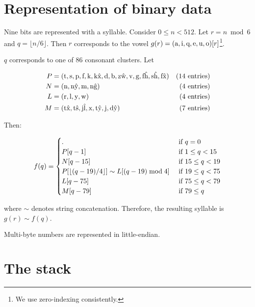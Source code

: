\documentclass{book}
\begin{document}
\section{Representation of binary data}

\newcommand{\kd}[1]{\text{\textkardinal{#1}},}
\newcommand{\kdf}[1]{\text{\textkardinal{#1}}}

Nine bits are represented with a syllable. Consider $0 \le n < 512$. Let $r = n \bmod 6$ and $q = \lfloor n / 6 \rfloor$. Then $r$ corresponds to the vowel $g(r) = (\kd{a} \kd{i} \kd{q} \kd{e} \kd{u} \kdf{o})[r]$\footnote{We use zero-indexing consistently.}.

$q$ corresponds to one of 86 consonant clusters. Let

\begin{align}
    P &= (\kd{t} \kd{s} \kd{p} \kd{f} \kd{k} \kd{k\^x} \kd{d} \kd{b} \kd{z\^w} \kd{v} \kd{g} \kd{f\^h} \kd{s\^h} \kdf{f\^x}) & \text{(14 entries)} \\
    N &= (\kd{n} \kd{n\^y} \kd{m} \kdf{n\^g}) & \text{(4 entries)} \\
    L &= (\kd{r} \kd{l} \kd{y} \kdf{w}) & \text{(4 entries)} \\
    M &= (\kd{t\^x} \kd{t\^s} \kd{j\^l} \kd{x} \kd{t\^y} \kd{j} \kdf{d\^y}) & \text{(7 entries)}
\end{align}

Then:

\begin{equation}
    f(q) = \begin{cases}
        \kdf{.} & \text{ if } q = 0 \\
        P[q - 1] & \text{ if } 1 \le q < 15 \\
        N[q - 15] & \text{ if } 15 \le q < 19 \\
        P[\lfloor (q - 19) / 4 \rfloor] \sim L[(q - 19) \bmod 4] & \text{ if } 19 \le q < 75 \\
        L[q - 75] & \text{ if } 75 \le q < 79 \\
        M[q - 79] & \text{ if } 79 \le q
    \end{cases}
\end{equation}

where $\sim$ denotes string concatenation. Therefore, the resulting syllable is $g(r) \sim f(q)$.

Multi-byte numbers are represented in little-endian.

\section{The stack}
\end{document}

